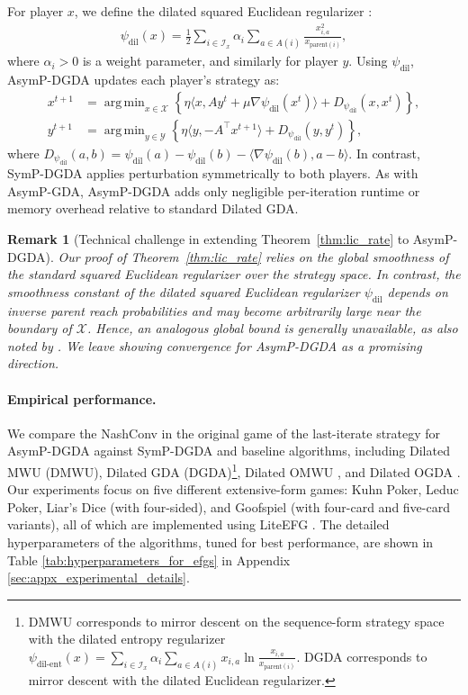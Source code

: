 \documentclass{article}
\DeclareMathOperator*{\argmin}{arg\,min}
\newcommand{\X}{\mathcal{X}}
\newcommand{\Y}{\mathcal{Y}}
\theoremstyle{plain}
\newtheorem{remark}[theorem]{Remark}
\begin{document}
For player $x$, we define the dilated squared Euclidean regularizer \citep{hoda2010smoothing}:
\begin{align*}
    \psi_{\mathrm{dil}}(x) = \frac{1}{2} \sum_{i\in \mathcal{I}_x}\alpha_i\sum_{a\in A(i)} \frac{x_{i, a}^2}{x_{\mathrm{parent}(i)}},
\end{align*}
where $\alpha_i > 0$ is a weight parameter, and similarly for player $y$.
Using $\psi_{\mathrm{dil}}$, AsymP-DGDA updates each player's strategy as:
\begin{align*}
    x^{t+1} & = \argmin_{x \in \X} \left\{ \eta \langle x, Ay^t + \mu\nabla\psi_{\mathrm{dil}}(x^{t}) \rangle + D_{\psi_{\mathrm{dil}}}(x,x^{t})\right\}, \\
    y^{t+1} & = \argmin_{y \in \Y} \left\{ \eta \langle y, -A^{\top}x^{t+1}  \rangle + D_{\psi_{\mathrm{dil}}}(y,y^{t})\right\},
\end{align*}
where $D_{\psi_{\mathrm{dil}}}(a, b) = \psi_{\mathrm{dil}}(a) - \psi_{\mathrm{dil}}(b) - \langle \nabla \psi_{\mathrm{dil}}(b), a-b\rangle$.
In contrast, SymP-DGDA applies perturbation symmetrically to both players.
As with AsymP-GDA, AsymP-DGDA adds only negligible per-iteration runtime or memory overhead relative to standard Dilated GDA.

\begin{remark}[Technical challenge in extending Theorem~\ref{thm:lic_rate} to AsymP-DGDA]
    \normalfont
    Our proof of Theorem~\ref{thm:lic_rate} relies on the global smoothness of the standard squared Euclidean regularizer over the strategy space.
    In contrast, the smoothness constant of the dilated squared Euclidean regularizer $\psi_{\mathrm{dil}}$ depends on inverse parent reach probabilities and may become arbitrarily large near the boundary of $\X$.
    Hence, an analogous global bound is generally unavailable, as also noted by \citet{lee2021last}.
    We leave showing convergence for AsymP-DGDA as a promising direction.
\end{remark}

\paragraph{Empirical performance.}
We compare the NashConv in the original game of the last-iterate strategy for AsymP-DGDA against SymP-DGDA and baseline algorithms, including Dilated MWU (DMWU), Dilated GDA (DGDA)\footnote{DMWU corresponds to mirror descent on the sequence-form strategy space with the dilated entropy regularizer $\psi_{\mathrm{dil\mbox{-}ent}}(x) = \sum_{i\in \mathcal{I}_x}\alpha_i\sum_{a\in A(i)} x_{i,a}\ln\frac{x_{i,a}}{x_{\mathrm{parent}(i)}}$. DGDA corresponds to mirror descent with the dilated Euclidean regularizer.}, Dilated OMWU \citep{kroer2020faster,lee2021last}, and Dilated OGDA \citep{farina2019optimistic,lee2021last}.
Our experiments focus on five different extensive-form games: Kuhn Poker, Leduc Poker, Liar’s Dice (with four-sided), and Goofspiel (with four-card and five-card variants), all of which are implemented using LiteEFG \citep{liu2024liteefgefficientpythonlibrary}.
The detailed hyperparameters of the algorithms, tuned for best performance, are shown in Table \ref{tab:hyperparameters_for_efgs} in Appendix \ref{sec:appx_experimental_details}.
\end{document}
